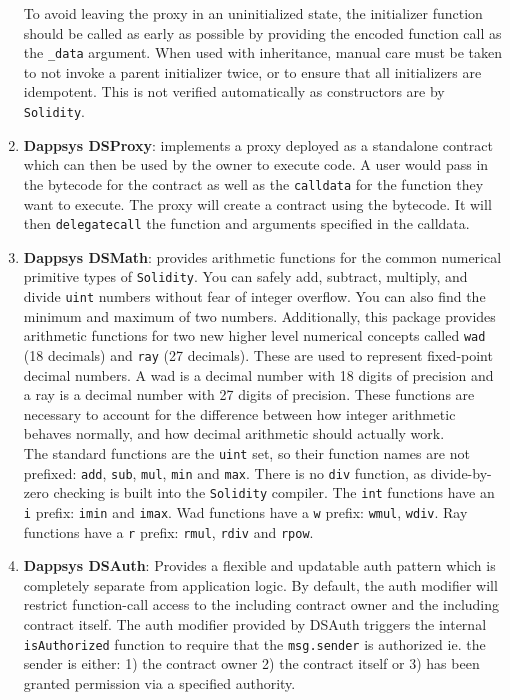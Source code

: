 \begin{enumerate}
To avoid leaving the proxy in an uninitialized state, the initializer function should be called as early as possible by providing the encoded function call as the \verb|_data| argument. When used with inheritance, manual care must be taken to not invoke a parent initializer twice, or to ensure that all initializers are idempotent. This is not verified automatically as constructors are by \verb|Solidity|.

\item\textbf{Dappsys DSProxy}: implements a proxy deployed as a standalone contract which can then be used by the owner to execute code. A user would pass in the bytecode for the contract as well as the \verb|calldata| for the function they want to execute. The proxy will create a contract using the bytecode. It will then \verb|delegatecall| the function and arguments specified in the calldata.

\item\textbf{Dappsys DSMath}: provides arithmetic functions for the common numerical primitive types of \verb|Solidity|. You can safely add, subtract, multiply, and divide \verb|uint| numbers without fear of integer overflow. You can also find the minimum and maximum of two numbers. Additionally, this package provides arithmetic functions for two new higher level numerical concepts called \verb|wad| (18 decimals) and \verb|ray| (27 decimals). These are used to represent fixed-point decimal numbers. A wad is a decimal number with 18 digits of precision and a ray is a decimal number with 27 digits of precision. These functions are necessary to account for the difference between how integer arithmetic behaves normally, and how decimal arithmetic should actually work.\\

The standard functions are the \verb|uint| set, so their function names are not  prefixed: \verb|add|, \verb|sub|, \verb|mul|, \verb|min| and \verb|max|. There is no \verb|div| function, as divide-by-zero checking is built into the \verb|Solidity| compiler. The \verb|int| functions have an \verb|i| prefix: \verb|imin| and \verb|imax|. Wad functions have a \verb|w| prefix: \verb|wmul|, \verb|wdiv|. Ray functions have a \verb|r| prefix: \verb|rmul|, \verb|rdiv| and \verb|rpow|.

\item\textbf{Dappsys DSAuth}: Provides a flexible and updatable auth pattern which is completely separate from application logic. By default, the auth modifier will restrict function-call access to the including contract owner and the including contract itself. The auth modifier provided by DSAuth triggers the internal \verb|isAuthorized| function to require that the \verb|msg.sender| is authorized ie. the sender is either: 1) the contract owner 2) the contract itself or 3) has been granted permission via a specified authority.


\end{enumerate}

